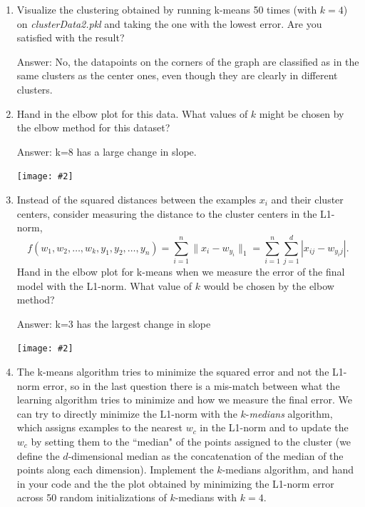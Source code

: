 \documentclass{article}
\def\ans#1{\par\gre{Answer: #1}}
\def\blu#1{{\color{blu}#1}}
\def\gre#1{{\color{gre}#1}}
\def\norm#1{\|#1\|}
\newcommand{\centerfig}[2]{\begin{center}\texttt{[image: \#2]}\end{center}}
\def\enum#1{\begin{enumerate}#1\end{enumerate}}
\begin{document}
 \blu{\enum{
 \item Visualize the clustering obtained by running k-means 50 times (with $k=4$) on \emph{clusterData2.pkl} and taking the one with the lowest error. Are you satisfied with the result?
 \ans{No, the datapoints on the corners of the graph are classified as in the same clusters as the center ones, even though they are clearly in different clusters.}
 \item Hand in the elbow plot for this data. What values of $k$ might be chosen by the elbow method for this dataset?
 \ans{k=8 has a large change in slope.}
\centerfig{.7}{figs/kmeans4.3.2_lowesterrors}
 \item Instead of the squared distances between the examples $x_i$ and their cluster centers, consider measuring the distance to the cluster centers in the L1-norm,
\[
f(w_1,w_2,\dots,w_k,y_1,y_2,\dots,y_n) = \sum_{i=1}^n \norm{x_i - w_{y_i}}_1 = \sum_{i=1}^n \sum_{j=1}^d |x_{ij} - w_{y_ij}|.
\]
Hand in the elbow plot for k-means when we measure the error of the final model with the L1-norm.
What value of $k$ would be chosen by the elbow method?
 \ans{k=3 has the largest change in slope}
\centerfig{.7}{figs/kmeans4.3.3_lowesterrors}
 \item The k-means algorithm tries to minimize the squared error and not the L1-norm error, so in the last question there is a mis-match between what the learning algorithm tries to minimize and how we measure the final error. We can try to directly minimize the L1-norm with the $k$-\emph{medians} algorithm, which assigns examples to the nearest $w_c$ in the L1-norm and to update the $w_c$ by setting them to the ``median" of the points assigned to the cluster (we define the $d$-dimensional median as the concatenation of the median of the points along each dimension). Implement the $k$-medians algorithm, and hand in your code and the the plot obtained by minimizing the L1-norm error across 50 random initializations of $k$-medians with $k=4$.
 \begin{center}
 \end{center}
 \begin{center}

\end{center}}}
\end{document}
